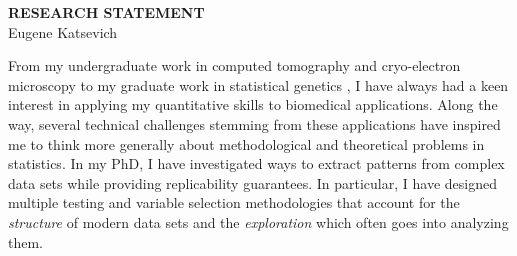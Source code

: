 \documentclass[11pt]{article}
\begin{document}
\thispagestyle{fancy}
\lhead{}
\rhead{}
\renewcommand{\headrulewidth}{0pt} 
\renewcommand{\footrulewidth}{0pt} 


\pagestyle{fancy}
\lhead{\textcolor{gray}{\it Eugene Katsevich}}
\rhead{\textcolor{gray}{\thepage/\totalpages{}}}


\begin{center}
{\LARGE \bf RESEARCH STATEMENT}\\
\vspace*{0.1cm}
{\normalsize Eugene Katsevich}
\end{center}


From my undergraduate work in computed tomography \cite{KKW12, KetZ14} and cryo-electron microscopy \cite{KetS15, AetS15} to my graduate work in statistical genetics \cite{MKF, Focused_BH}, I have always had a keen interest in applying my quantitative skills to biomedical applications. Along the way, several technical challenges stemming from these applications have inspired me to think more generally about methodological and theoretical problems in statistics. In my PhD, I have investigated ways to extract patterns from complex data sets while providing replicability guarantees. In particular, I have designed multiple testing and variable selection methodologies that account for the \textit{structure} of modern data sets and the \textit{exploration} which often goes into analyzing them. 


\end{document}
